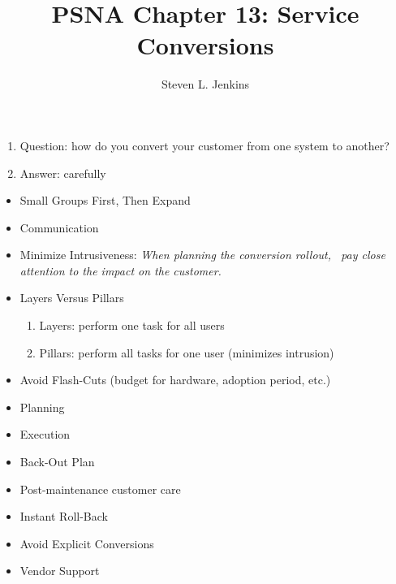 \documentclass{slides}
\title{PSNA Chapter 13: Service Conversions}
\author{Steven L. Jenkins}
\newcommand{\bi}{\begin{itemize}}
\newcommand{\ei}{\end{itemize}}
\newcommand{\be}{\begin{enumerate}}
\newcommand{\ee}{\end{enumerate}}
\begin{document}

\be
\item[Question:] how do you convert your customer from one system to another?
\item[Answer:] carefully
\ee


\bi
\item Small Groups First, Then Expand
\item Communication
\item Minimize Intrusiveness: \emph{When planning the conversion rollout, \
  pay close attention to the impact on the customer.}
\item Layers Versus Pillars
  \be
  \item[Layers:] perform one task for all users
  \item[Pillars:] perform all tasks for one user (minimizes intrusion)
  \ee
\item Avoid Flash-Cuts (budget for hardware, adoption period, etc.)
\ei


\bi
\item Planning
\item Execution
\item Back-Out Plan
\item Post-maintenance customer care
\ei


\bi
\item Instant Roll-Back
\item Avoid Explicit Conversions
\item Vendor Support
\ei
\end{document}
